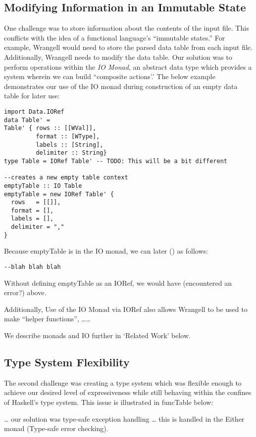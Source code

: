 \documentclass[preprint,nocopyrightspace]{sig-alternate}
\begin{document}
\subsection{Modifying Information in an Immutable State}
One challenge was to store information about the contents of the input file. This conflicts with the idea of a functional language’s “immutable states.” For example, Wrangell would need to store the parsed data table from each input file. Additionally, Wrangell needs to modify the data table. Our solution was to perform operations within the \emph{IO Monad}, an abstract data type which provides a system wherein we can build ``composite actions’.’ 
The below example demonstrates our use of the IO monad during construction of an empty data table for later use: 
\begin{lstlisting}
import Data.IORef
data Table' = 
Table' { rows :: [[WVal]], 
         format :: [WType], 
         labels :: [String], 
         delimiter :: String}
type Table = IORef Table' -- TODO: This will be a bit different

--creates a new empty table context
emptyTable :: IO Table
emptyTable = new IORef Table' {    
  rows   = [[]],
  format = [],
  labels = [],
  delimiter = ","
}
\end{lstlisting}

Because emptyTable is in the IO monad, we can later () as follows:
\begin{lstlisting}
--blah blah blah
\end{lstlisting}

Without defining emptyTable as an IORef, we would have (encountered an error?) above. 

Additionally, Use of the IO Monad via IORef also allows Wrangell to be used to make “helper functions”, ……

We describe monads and IO further in ‘Related Work’ below. 

\subsection{Type System Flexibility}
The second challenge was creating a type system which was flexible enough to achieve our desired level of expressiveness while still behaving within the confines of Haskell’s type system. This issue is illustrated in funcTable below:

… our solution was type-safe exception handling … this is handled in the Either monad (Type-safe error checking). 
\end{document}
